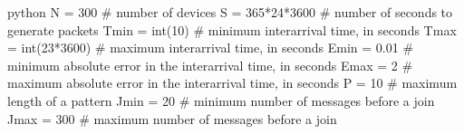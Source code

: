 \begin{mintedbox}{python}
N = 300     # number of devices
S = 365*24*3600     # number of seconds to generate packets
Tmin = int(10)      # minimum interarrival time, in seconds
Tmax = int(23*3600)     # maximum interarrival time, in seconds
Emin = 0.01     # minimum absolute error in the interarrival time, in seconds
Emax = 2        # maximum absolute error in the interarrival time, in seconds
P = 10      # maximum length of a pattern
Jmin = 20       # minimum number of messages before a join
Jmax = 300      # maximum number of messages before a join
\end{mintedbox}